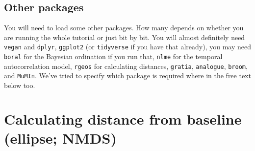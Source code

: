 \documentclass[nofonts,]{tufte-handout}
\newenvironment{Shaded}{\begin{snugshade}}{\end{snugshade}}
\newcommand{\CommentTok}[1]{\textcolor[rgb]{0.56,0.35,0.01}{\textit{#1}}}
\newcommand{\DecValTok}[1]{\textcolor[rgb]{0.00,0.00,0.81}{#1}}
\newcommand{\FunctionTok}[1]{\textcolor[rgb]{0.13,0.29,0.53}{\textbf{#1}}}
\newcommand{\NormalTok}[1]{#1}
\newcommand{\OtherTok}[1]{\textcolor[rgb]{0.56,0.35,0.01}{#1}}
\newcommand{\SpecialCharTok}[1]{\textcolor[rgb]{0.81,0.36,0.00}{\textbf{#1}}}
\newcommand{\StringTok}[1]{\textcolor[rgb]{0.31,0.60,0.02}{#1}}
\begin{document}
\begin{Shaded}
\end{Shaded}

\hypertarget{other-packages}{%
\subsection{Other packages}\label{other-packages}}

You will need to load some other packages. How many depends on whether
you are running the whole tutorial or just bit by bit. You will almost
definitely need \texttt{vegan} and \texttt{dplyr}, \texttt{ggplot2} (or
\texttt{tidyverse} if you have that already), you may need
\texttt{boral} for the Bayesian ordination if you run that,
\texttt{nlme} for the temporal autocorrelation model, \texttt{rgeos} for
calculating distances, \texttt{gratia}, \texttt{analogue},
\texttt{broom}, and \texttt{MuMIn}. We've tried to specify which package
is required where in the free text below too.

\hypertarget{calculating-distance-from-baseline-ellipse-nmds}{%
\section{Calculating distance from baseline (ellipse;
NMDS)}\label{calculating-distance-from-baseline-ellipse-nmds}}
\end{document}
